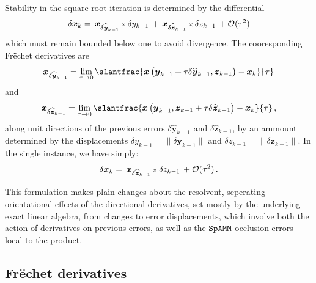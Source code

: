 \documentclass[letterpaper,twocolumn,amsmath,amsfont,amssymb,english,aps,jcp,preprintnumbers,groupaddress,nofootinbib,tightenlines,floatfix]{revtex4}
\newcommand{\mat}[1]{\boldsymbol{#1}}
\theoremstyle{plain}
\theoremstyle{remark}
\theoremstyle{plain}
\begin{document}
Stability in the square root iteration is determined  by the differential 
\begin{equation} \label{firstorderdual}
\delta \mat{x}_k = \,  { \mat{x}}_{\delta \widehat{\mat{y}}_{k-1}}  \, {\scriptstyle \times} \, \delta y_{k-1}
                 \, + \,  { \mat{x}}_{\delta \widehat{\mat{z}}_{k-1}}  \, {\scriptstyle \times} \, \delta z_{k-1}  \, + {\cal O}(\tau^2) 
\end{equation}
which must remain bounded below one to avoid divergence.   The cooresponding Fr\"{e}chet derivatives are
\begin{equation}
  \mat{x}_{\delta \widehat{ \mat{y}}_{k-1}}
= \lim_{\tau \rightarrow 0} \slantfrac{ \mat{x} \left( \mat{y}_{k-1} + \tau \delta \widehat{\mat{y}}_{k-1} ,  {\mat{z}}_{k-1}  \right)
                                     -\mat{x}_k    }{\tau} 
 \end{equation}
and
 \begin{equation}
 \mat{x}_{\delta \widehat{ \mat{z}}_{k-1}} = \lim_{\tau \rightarrow 0}
\slantfrac{ \mat{x} \left( {\mat{y}}_{k-1} , \mat{z}_{k-1} +\tau  \delta \widehat{\mat{z}}_{k-1} \right) - \mat{x}_k   }{\tau}  \, , 
 \end{equation}
along unit directions of the previous errors $\delta \widehat{\mat{y}}_{k-1}$ and $\delta \widehat{\mat{z}}_{k-1}$, by an ammount
determined by the displacements $\delta y_{k-1} = \lVert \delta \mat{y}_{k-1} \rVert$  and  $\delta z_{k-1}=\lVert \delta \mat{z}_{k-1} \rVert$.
In the single instance, we have simply:
\begin{equation} \label{firstordersingle}
\delta \mat{x}_k = \,  { \mat{x}}_{\delta \widehat{\mat{z}}_{k-1}}  \, {\scriptstyle \times} \, \delta z_{k-1}  \, + {\cal O}(\tau^2)  \, .
\end{equation}

This formulation makes plain changes about the resolvent, seperating orientational effects 
of the directional derivatives, set mostly by the underlying exact linear algebra, from 
changes to error displacements, which involve both the action of derivatives on previous errors,  as well as 
the $\tt SpAMM$ occlusion errors local to the product.


\subsection{Fr\"{e}chet derivatives}
 
\end{document}
